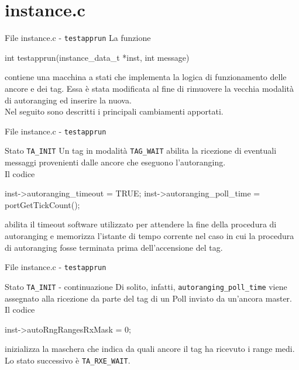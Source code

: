 \section{instance.c}
\begin{frame}[fragile]{File instance.c - \lstinline[language=C]!testapprun!}
  La funzione
  \begin{C}
    int testapprun(instance_data_t *inst, int message)
  \end{C}
  contiene una macchina a stati che implementa la logica di funzionamento delle ancore e dei tag.
  Essa è stata modificata al fine di rimuovere la vecchia modalità di autoranging ed inserire la nuova.\\
  Nel seguito sono descritti i principali \alert{cambiamenti} apportati.
\end{frame}

\begin{frame}[fragile]{File instance.c - \lstinline[language=C]!testapprun!}
  \begin{block}{Stato \lstinline[language=C]!TA_INIT!}
    Un tag in modalità \lstinline[language=C]!TAG_WAIT! abilita la ricezione di eventuali messaggi
    provenienti dalle ancore che eseguono l'autoranging.\\
    Il codice
    \begin{C}
      inst->autoranging_timeout = TRUE;
      inst->autoranging_poll_time = portGetTickCount();
    \end{C}
    abilita il timeout software utilizzato per attendere la fine della procedura di autoranging e
    memorizza l'istante di tempo corrente nel caso in cui la procedura di autoranging fosse terminata
    prima dell'accensione del tag.
  \end{block}
\end{frame}

\begin{frame}[fragile]{File instance.c - \lstinline[language=C]!testapprun!}
  \begin{block}{Stato \lstinline[language=C]!TA_INIT! - continuazione}
    Di solito, infatti, \lstinline[language=C]!autoranging_poll_time! viene assegnato
    alla ricezione da parte del tag di un Poll inviato da un'ancora master.\\
    Il codice
    \begin{C}
      inst->autoRngRangesRxMask = 0;
    \end{C}
    inizializza la maschera che indica da quali ancore il tag ha ricevuto i range medi.\\
    \alert{Lo stato successivo} è \lstinline[language=C]!TA_RXE_WAIT!.
  \end{block}
\end{frame}

